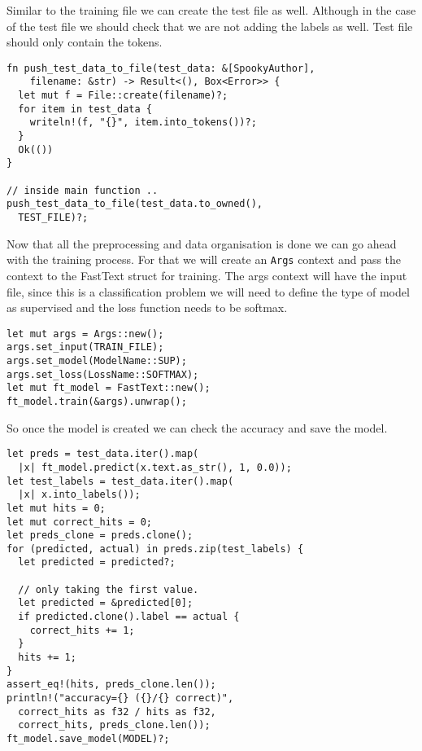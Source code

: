 \documentclass{book}
\begin{document}
Similar to the training file we can create the test file as well. Although in the case of the test file we should check that we are not adding the labels as well. Test file should only contain the tokens.

\begin{lstlisting}[caption={chapter5\\/fasttext\\-model\\/src\\/main\\.rs}, basicstyle=\small]
fn push_test_data_to_file(test_data: &[SpookyAuthor],
    filename: &str) -> Result<(), Box<Error>> {
  let mut f = File::create(filename)?;
  for item in test_data {
    writeln!(f, "{}", item.into_tokens())?;
  }
  Ok(())
}

// inside main function ..
push_test_data_to_file(test_data.to_owned(),
  TEST_FILE)?;
\end{lstlisting}

Now that all the preprocessing and data organisation is done we can go ahead with the training process. For that we will create an \lstinline{Args} context and pass the context to the FastText struct for training. The args context will have the input file, since this is a classification problem we will need to define the type of model as supervised and the loss function needs to be softmax.

\begin{lstlisting}[caption={chapter5\\/fasttext\\-model\\/src\\/main\\.rs}, basicstyle=\small]
let mut args = Args::new();
args.set_input(TRAIN_FILE);
args.set_model(ModelName::SUP);
args.set_loss(LossName::SOFTMAX);
let mut ft_model = FastText::new();
ft_model.train(&args).unwrap();
\end{lstlisting}

So once the model is created we can check the accuracy and save the model.

\begin{lstlisting}[caption={chapter5\\/fasttext\\-model\\/src\\/main\\.rs}, basicstyle=\small]
let preds = test_data.iter().map(
  |x| ft_model.predict(x.text.as_str(), 1, 0.0));
let test_labels = test_data.iter().map(
  |x| x.into_labels());
let mut hits = 0;
let mut correct_hits = 0;
let preds_clone = preds.clone();
for (predicted, actual) in preds.zip(test_labels) {
  let predicted = predicted?;

  // only taking the first value.
  let predicted = &predicted[0];
  if predicted.clone().label == actual {
    correct_hits += 1;
  }
  hits += 1;
}
assert_eq!(hits, preds_clone.len());
println!("accuracy={} ({}/{} correct)",
  correct_hits as f32 / hits as f32,
  correct_hits, preds_clone.len());
ft_model.save_model(MODEL)?;
\end{lstlisting}
\end{document}
